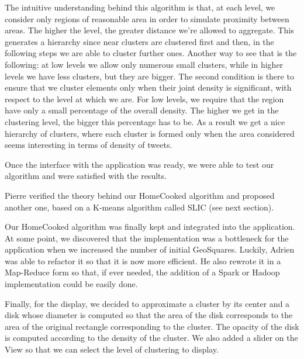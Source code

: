 The intuitive understanding behind this algorithm is that, at each level, we consider only regions of reasonable area in order to simulate proximity between areas. The higher the level, the greater distance we're allowed to aggregate. This generates a hierarchy since near clusters are clustered first and then, in the following steps we are able to cluster further ones. Another way to see that is the following: at low levels we allow only numerous small clusters, while in higher levels we have less clusters, but they are bigger. The second condition is there to ensure that we cluster elements only when their joint density is significant, with respect to the level at which we are. For low levels, we require that the region have only a small percentage of the overall density. The higher we get in the clustering level, the bigger this percentage has to be. As a result we get a nice hierarchy of clusters, where each cluster is formed only when the area considered seems interesting in terms of density of tweets. 

Once the interface with the application was ready, we were able to test our algorithm and were satisfied with the results. 

Pierre verified the theory behind our HomeCooked algorithm and proposed another one, based on a K-means algorithm called SLIC (see next section).

Our HomeCooked algorithm was finally kept and integrated into the application. At some point, we discovered that the implementation was a bottleneck for the application when we increased the number of initial GeoSquares. Luckily, Adrien was able to refactor it so that it is now more efficient. He also rewrote it in a Map-Reduce form so that, if ever needed, the addition of a Spark or Hadoop implementation could be easily done. 

Finally, for the display, we decided to approximate a cluster by its center and a disk whose diameter is computed so that the area of the disk corresponds to the area of the original rectangle corresponding to the cluster. The opacity of the disk is computed according to the density of the cluster. We also added a slider on the View so that we can select the level of clustering to display. 
